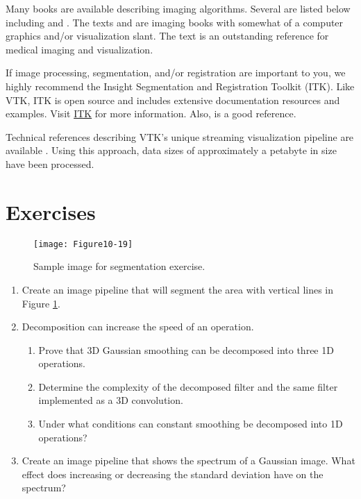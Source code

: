 Many books are available describing imaging algorithms. Several are listed below including \cite{Gonzalez92} and \cite{Russ95}. The texts \cite{Pavlidis82} and \cite{Wolberg90} are imaging books with somewhat of a computer graphics and/or visualization slant. The text \cite{Robb95} is an outstanding reference for medical imaging and visualization.

If image processing, segmentation, and/or registration are important to you, we highly recommend the Insight Segmentation and Registration Toolkit (ITK). Like VTK, ITK is open source and includes extensive documentation resources and examples. Visit \href{https://itk.org/}{ITK} for more information. Also, \cite{Ibanez03} is a good reference.

Technical references describing VTK's unique streaming visualization pipeline are available \cite{Law99} \cite{Martin01}. Using this approach, data sizes of approximately a petabyte in size have been processed.


\printbibliography

\section{Exercises}

\begin{figure}[!htb]
	\centering
	\texttt{[image: Figure10-19]}
	\caption{Sample image for segmentation exercise.}
	\label{fig:Figure10-19}
\end{figure}

\begin{enumerate}

\item Create an image pipeline that will segment the area with vertical lines in Figure \ref{fig:Figure10-19}.

\item Decomposition can increase the speed of an operation.

    \begin{enumerate}

    \item Prove that 3D Gaussian smoothing can be decomposed into three 1D operations.

    \item Determine the complexity of the decomposed filter and the same filter implemented as a 3D convolution.

    \item Under what conditions can constant smoothing be decomposed into 1D operations?

    \end{enumerate}

\item Create an image pipeline that shows the spectrum of a Gaussian image. What effect does increasing or decreasing the standard deviation have on the spectrum?

\end{enumerate}
